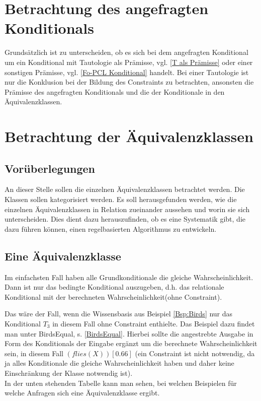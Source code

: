 \documentclass[a4paper, 11pt]{book}
\begin{document}
 












\section{Betrachtung des angefragten Konditionals}
Grundsätzlich ist zu unterscheiden, ob es sich bei dem angefragten Konditional um ein Konditional mit Tautologie als Prämisse, vgl. \ref{T als Prämisse} oder einer sonstigen Prämisse, vgl. \ref{Fo-PCL Konditional} handelt. Bei einer Tautologie ist nur die Konklusion bei der Bildung des Constraints zu betrachten, ansonsten die Prämisse des angefragten Konditionals und die der Konditionale in den Äquivalenzklassen.


\section{Betrachtung der Äquivalenzklassen}
\subsection{Vorüberlegungen}
An dieser Stelle sollen die einzelnen Äquivalenzklassen betrachtet werden. Die Klassen sollen kategorisiert werden. Es soll herausgefunden werden, wie die einzelnen Äquivalenzklassen in Relation zueinander aussehen und worin sie sich unterscheiden. Dies dient dazu herauszufinden, ob es eine Systematik gibt, die dazu führen können, einen regelbasierten Algorithmus zu entwickeln. 
\label{Eine Äquivalenzklasse}
\subsection{Eine Äquivalenzklasse}
Im einfachsten Fall haben alle Grundkonditionale die gleiche Wahrscheinlichkeit. Dann ist nur das bedingte Konditional auszugeben, d.h. das relationale Konditional mit der berechneten Wahrscheinlichkeit(ohne Constraint).

Das wäre der Fall, wenn die Wissensbasis aus Beispiel \ref{Bsp:Birds} nur das Konditional $ T_3 $ in diesem Fall ohne Constraint enthielte. Das Beispiel dazu findet man unter BirdsEqual, s. \ref{BirdsEqual}. Hierbei sollte die angestrebte Ausgabe  in Form des Konditionals der Eingabe ergänzt um die berechnete Wahrscheinlichkeit sein, in diesem Fall $ (flies(X)) [0.66]$ (ein Constraint ist nicht notwendig, da ja alles Konditionale die gleiche Wahrscheinlichkeit haben und daher keine Einschränkung der Klasse notwendig ist).\\
In der unten stehenden Tabelle kann man sehen, bei welchen Beispielen für welche Anfragen sich eine Äquivalenzklasse ergibt. 
\end{document}
